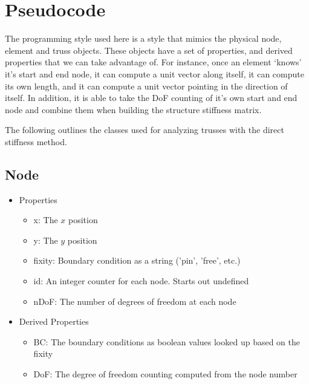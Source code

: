 \section{Pseudocode}

The programming style used here is a style that mimics the physical node, element and truss objects. These objects have a set of properties, and derived properties that we can take advantage of. For instance, once an element `knows' it's start and end node, it can compute a unit vector along itself, it can compute its own length, and it can compute a unit vector pointing in the direction of itself. In addition, it is able to take the DoF counting of it's own start and end node and combine them when building the structure stiffness matrix.

The following outlines the classes used for analyzing trusses with the direct stiffness method.

\newenvironment{myitemize}
{ \begin{itemize}
    \setlength{\itemsep}{0pt}
    \setlength{\parskip}{0pt}
    \setlength{\parsep}{0pt}     }
{ \end{itemize}                  }

\subsection*{Node}

\begin{itemize}

\item Properties

\begin{myitemize}
  \item x: The $x$ position
  \item y: The $y$ position
  \item fixity: Boundary condition as a string ('pin', 'free', etc.)
  \item id: An integer counter for each node. Starts out undefined
  \item nDoF: The number of degrees of freedom at each node
\end{myitemize}

\item Derived Properties

\begin{myitemize}
  \item BC: The boundary conditions as boolean values looked up based on the fixity
  \item DoF: The degree of freedom counting computed from the node number
\end{myitemize}
\end{itemize}


